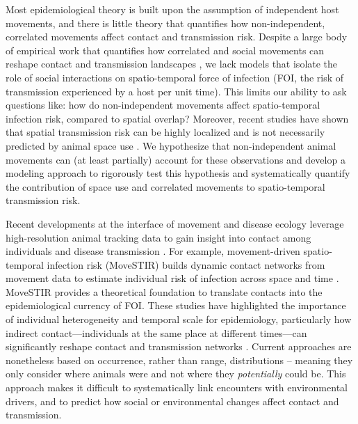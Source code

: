 \documentclass[letterpaper]{article}
\begin{document}
Most epidemiological theory is built upon the assumption of independent host movements, and there is little theory that quantifies how non-independent, correlated movements affect contact and transmission risk. Despite a large body of empirical work that quantifies how correlated and social movements can reshape contact and transmission landscapes \citep[e.g.,][]{Kjaer2008,Grear2010,Schauber2015a}, we lack models that isolate the role of social interactions on spatio-temporal force of infection (FOI, the risk of transmission experienced by a host per unit time). This limits our ability to ask questions like: how do non-independent movements affect spatio-temporal infection risk, compared to spatial overlap? Moreover, recent studies have shown that spatial transmission risk can be highly localized \citep{Albery2021} and is not necessarily predicted by animal space use \citep{Yang2023a}. We hypothesize that non-independent animal movements can (at least partially) account for these observations and develop a modeling approach to rigorously test this hypothesis and systematically quantify the contribution of space use and correlated movements to spatio-temporal transmission risk.

Recent developments at the interface of movement and disease ecology leverage high-resolution animal tracking data to gain insight into contact among individuals and disease transmission \citep{Richardson2015,Wilber2022,Yang2023}. For example, movement-driven spatio-temporal infection risk (MoveSTIR) builds dynamic contact networks from movement data to estimate individual risk of infection across space and time \citep{Wilber2022}. MoveSTIR provides a theoretical foundation to translate contacts into the epidemiological currency of FOI. These studies have highlighted the importance of individual heterogeneity and temporal scale for epidemiology, particularly how indirect contact---individuals at the same place at different times---can significantly reshape contact and transmission networks \citep{Richardson2015,Yang2023}. Current approaches are nonetheless based on occurrence, rather than range, distributions \citep[in the terminology of ][]{Alston2022} -- meaning they only consider where animals were and not where they \emph{potentially} could be. This approach makes it difficult to systematically link encounters with environmental drivers, and to predict how social or environmental changes affect contact and transmission. 
\end{document}
